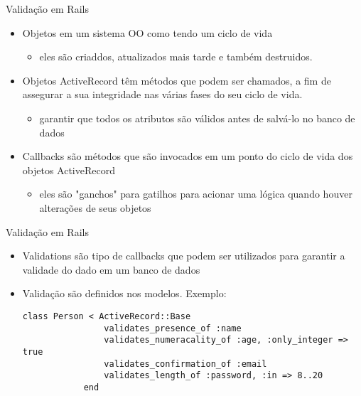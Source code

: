 \begin{frame}{Validação em Rails}
	\begin{itemize}
		\item \alert{Objetos} em um sistema OO como tendo um \alert{ciclo de vida}
		\begin{itemize}
			\item eles são criaddos, atualizados mais tarde e também destruidos.
		\end{itemize}
				
		\item Objetos ActiveRecord têm \alert{métodos} que podem ser chamados, a fim de
		assegurar a sua \alert{integridade} nas várias fases do seu ciclo de vida.
		\begin{itemize}
			\item garantir que todos os atributos são \alert{válidos} antes de salvá-lo no
				banco de dados
		\end{itemize}
		
		\item \alert{Callbacks} são métodos que são invocados em um ponto do ciclo 
			de vida dos objetos ActiveRecord
		\begin{itemize}
			\item eles são "ganchos" para gatilhos para acionar uma lógica quando houver
			alterações de seus objetos
		\end{itemize}
	\end{itemize}
\end{frame}
\begin{frame}[t, fragile]{Validação em Rails}
	\begin{itemize}
		\item \alert{Validations} são tipo de \alert{callbacks} que podem ser utilizados 
			para garantir a validade do dado em um banco de dados 
		
		\item Validação são definidos nos \alert{modelos}. Exemplo:
		\begin{lstlisting}[style=RubyInputStyle]
			class Person < ActiveRecord::Base 
			    validates_presence_of :name
			    validates_numeracality_of :age, :only_integer => true 
			    validates_confirmation_of :email
			    validates_length_of :password, :in => 8..20	
			end 
		\end{lstlisting}			
		
	\end{itemize}
\end{frame}
